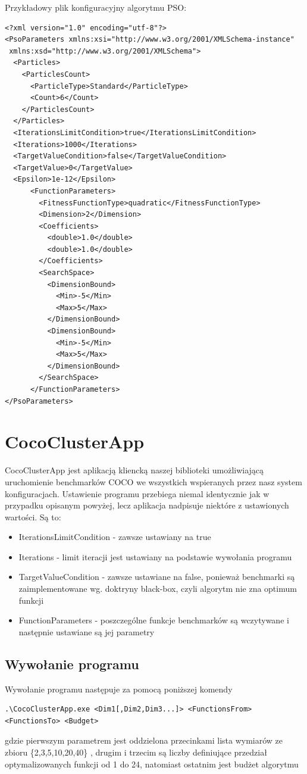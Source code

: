 \documentclass[12pt, twoside, openany, abstract=on]{report}
\theoremstyle{definition}
\begin{document}
\clearpage
Przykładowy plik konfiguracyjny algorytmu PSO:
\lstset{language=XML}
\begin{lstlisting}[frame=single]
<?xml version="1.0" encoding="utf-8"?>
<PsoParameters xmlns:xsi="http://www.w3.org/2001/XMLSchema-instance"
 xmlns:xsd="http://www.w3.org/2001/XMLSchema">
  <Particles>
    <ParticlesCount>
      <ParticleType>Standard</ParticleType>
      <Count>6</Count>
    </ParticlesCount>
  </Particles>
  <IterationsLimitCondition>true</IterationsLimitCondition>
  <Iterations>1000</Iterations>
  <TargetValueCondition>false</TargetValueCondition>
  <TargetValue>0</TargetValue>
  <Epsilon>1e-12</Epsilon>
      <FunctionParameters>
        <FitnessFunctionType>quadratic</FitnessFunctionType>
        <Dimension>2</Dimension>
        <Coefficients>
          <double>1.0</double>
          <double>1.0</double>
        </Coefficients>
        <SearchSpace>
          <DimensionBound>
            <Min>-5</Min>
            <Max>5</Max>
          </DimensionBound>
    	  <DimensionBound>
            <Min>-5</Min>
            <Max>5</Max>
          </DimensionBound>
        </SearchSpace>
      </FunctionParameters>
</PsoParameters>
\end{lstlisting}
\section{CocoClusterApp}
CocoClusterApp jest aplikacją kliencką naszej biblioteki umożliwiającą uruchomienie benchmarków COCO we wszystkich wspieranych przez nasz system konfiguracjach. Ustawienie programu przebiega niemal identycznie jak w przypadku opisanym powyżej, lecz aplikacja nadpisuje niektóre z ustawionych wartości. Są to:

\begin{itemize}
\item IterationsLimitCondition - zawsze ustawiany na true
\item Iterations - limit iteracji jest ustawiany na podstawie wywołania programu
\item TargetValueCondition - zawsze ustawiane na false, ponieważ benchmarki są zaimplementowane wg. doktryny black-box, czyli algorytm nie zna optimum funkcji
\item FunctionParameters - poszczególne funkcje benchmarków są wczytywane i następnie ustawiane są jej parametry
\end{itemize} 
\subsection{Wywołanie programu}
  Wywołanie programu następuje za pomocą poniższej komendy
\begin{lstlisting}[frame=single]
.\CocoClusterApp.exe <Dim1[,Dim2,Dim3...]> <FunctionsFrom> <FunctionsTo> <Budget>
\end{lstlisting}
gdzie pierwszym parametrem jest oddzielona przecinkami lista wymiarów ze zbioru \{2,3,5,10,20,40\} , drugim i trzecim są liczby definiujące przedział optymalizowanych funkcji od 1 do 24, natomiast ostatnim jest budżet algorytmu 
\end{document}
